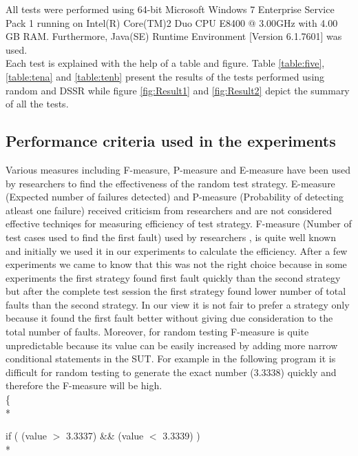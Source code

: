 \documentclass[10pt, conference, compsocconf]{IEEEtran}
\begin{document}
All tests were performed using 64-bit Microsoft Windows 7 Enterprise Service Pack 1 running on Intel(R) Core(TM)2 Duo CPU E8400 @ 3.00GHz with 4.00 GB RAM. Furthermore, Java(SE) Runtime Environment [Version 6.1.7601] was used.\\

Each test is explained with the help of a table and figure. Table \ref{table:five}, \ref{table:tena} and \ref{table:tenb} present the results of the tests performed using random and DSSR while figure \ref{fig:Result1} and \ref{fig:Result2} depict the summary of all the tests.



\subsection{Performance criteria used in the experiments}
Various measures including F-measure, P-measure and E-measure have been used by researchers to find the effectiveness of the random test strategy. E-measure (Expected number of failures detected) and P-measure (Probability of detecting atleast one failure) received criticism from researchers \cite{Chen2008} and are not considered effective techniqes for measuring efficiency of test strategy. F-measure (Number of test cases used to find the first fault) used by researchers  \cite{Chen1996}, \cite{Chen2004} is quite well known and initially we used it in our experiments to calculate the efficiency. After a few experiments we came to know that this was not the right choice because in some experiments the first strategy found first fault quickly than the second strategy but after the complete test session the first strategy found lower number of total faults than the second strategy. In our view it is not fair to prefer a strategy only because it found the first fault better without giving due consideration to the total number of faults. Moreover, for random testing F-measure is quite unpredictable because its value can be easily increased by adding more narrow conditional statements in the SUT. For example in the following program it is difficult for random testing to generate the exact number (3.3338) quickly and therefore the F-measure will be high.\\

\{ \\*   

\hspace{07 mm}if ( (value $>$  3.3337) \&\& (value $<$ 3.3339) )\\*
\end{document}

